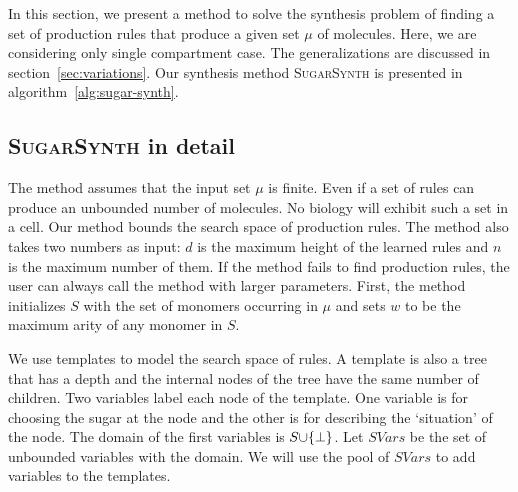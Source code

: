 In this section, we present a method to solve the synthesis problem of finding
a set of production rules that produce a given set $\mu$ of molecules.
Here, we are considering only single compartment case.
The generalizations are discussed in section~\ref{sec:variations}.
Our synthesis method \textsc{SugarSynth} is presented in algorithm~\ref{alg:sugar-synth}.




\subsection{\textsc{SugarSynth} in detail}

The method assumes that the input set $\mu$ is finite.
Even if a set of rules can produce
an unbounded number of molecules.
No biology will exhibit such a set in a cell.
Our method
bounds the search space of production rules.
The method also takes two numbers as input:
$d$ is the maximum height of the learned rules
and 
$n$ is the maximum number of them.
If the method fails to find production rules,
the user can always call the method with larger parameters.
First, the method initializes $S$ with the set of monomers occurring
in $\mu$
and sets $w$ to be the maximum arity of any monomer in $S$.


We use templates to model the search space of rules.
A template is also a tree that has a depth and
the internal nodes of the tree have the same number of children.
Two variables label each node of the template.
One variable is for choosing the sugar at the node and the other is for describing
the `situation' of the node.
The domain of the first variables is $S {\cup} \{\bot\}$.
Let $SVars$ be the set of unbounded variables with the domain.
We will use the pool of $SVars$ to add variables to the templates.

